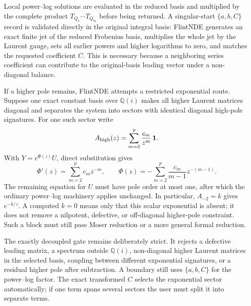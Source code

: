 \documentclass[11pt]{article}
\newcommand{\Id}{\mathbf 1}
\begin{document}
Local power--log solutions are evaluated in the reduced basis and multiplied by the complete
product $T_{Q_1}\cdots T_{Q_m}$ before being returned.  A singular-start $\{a,b,C\}$ record is
validated directly in the original integral basis: FlintNDE generates an exact finite jet of
the reduced Frobenius basis, multiplies the whole jet by the Laurent gauge, sets all earlier
powers and higher logarithms to zero, and matches the requested coefficient $C$.  This is
necessary because a neighboring series coefficient can contribute to the original-basis
leading vector under a non-diagonal balance.

If a higher pole remains, FlintNDE attempts a restricted exponential route.  Suppose one
exact constant basis over $\mathbb Q(i)$ makes all higher Laurent matrices diagonal and
separates the system into sectors with identical diagonal high-pole signatures.  For one
such sector write
\begin{equation}
  A_{\rm high}(z)=\sum_{m=2}^{p}\frac{c_m}{z^m}\,\Id.
\end{equation}
With $Y=e^{\Phi(z)}U$, direct substitution gives
\begin{equation}
  \Phi'(z)=\sum_{m=2}^{p}c_m z^{-m},\qquad
  \Phi(z)=-\sum_{m=2}^{p}\frac{c_m}{m-1}z^{-(m-1)}.
  \label{eq:implemented-exponential-factor}
\end{equation}
The remaining equation for $U$ must have pole order at most one, after which the ordinary
power--log machinery applies unchanged.  In particular, $A_{-2}=k$ gives
$e^{-k/z}$.  A computed $k=0$ means only that this scalar exponential is absent; it does not
remove a nilpotent, defective, or off-diagonal higher-pole constraint.  Such a block must
still pass Moser reduction or a more general formal reduction.

The exactly decoupled gate remains deliberately strict.  It rejects a defective leading
matrix, a spectrum outside $\mathbb Q(i)$, non-diagonal higher Laurent matrices in the
selected basis, coupling between different exponential signatures, or a residual higher
pole after subtraction.  A boundary still uses $\{a,b,C\}$ for the power--log factor.  The
exact transformed $C$ selects the exponential sector automatically; if one term spans
several sectors the user must split it into separate terms.
\end{document}

